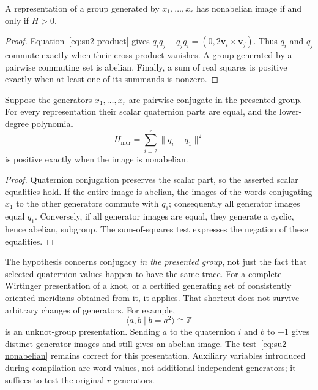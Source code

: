 \begin{lemma}
\label{lem:su2-nonabelian}
A representation of a group generated by $x_1,\ldots,x_r$ has nonabelian
image if and only if $H>0$.
\end{lemma}

\begin{proof}
Equation~\eqref{eq:su2-product} gives
$q_iq_j-q_jq_i=(0,2\mathbf v_i\times\mathbf v_j)$.
Thus $q_i$ and $q_j$ commute exactly when their cross product vanishes.
A group generated by a pairwise commuting set is abelian.  Finally, a sum
of real squares is positive exactly when at least one of its summands is
nonzero.
\end{proof}

\begin{lemma}
\label{lem:su2-meridional}
Suppose the generators $x_1,\ldots,x_r$ are pairwise conjugate in the
presented group.  For every representation their scalar quaternion parts
are equal, and the lower-degree polynomial
\[
 H_{\mathrm{mer}}=\sum_{i=2}^r\|q_i-q_1\|^2
\]
is positive exactly when the image is nonabelian.
\end{lemma}

\begin{proof}
Quaternion conjugation preserves the scalar part, so the asserted scalar
equalities hold.  If the entire image is abelian, the images of the words
conjugating $x_1$ to the other generators commute with $q_1$; consequently
all generator images equal $q_1$.  Conversely, if all generator images
are equal, they generate a cyclic, hence abelian, subgroup.  The
sum-of-squares test expresses the negation of these equalities.
\end{proof}

The hypothesis concerns conjugacy \emph{in the presented group}, not just
the fact that selected quaternion values happen to have the same trace.
For a complete Wirtinger presentation of a knot, or a certified generating
set of consistently oriented meridians obtained from it, it applies.
That shortcut does not survive arbitrary changes of generators.  For example,
\[
 \langle a,b\mid b=a^2\rangle\cong\mathbb Z
\]
is an unknot-group presentation.  Sending $a$ to the quaternion $i$ and $b$
to $-1$ gives distinct generator images and still gives an abelian image.
The test~\eqref{eq:su2-nonabelian} remains correct for this presentation.
Auxiliary variables introduced during compilation are word values, not
additional independent generators; it suffices to test the original $r$
generators.

